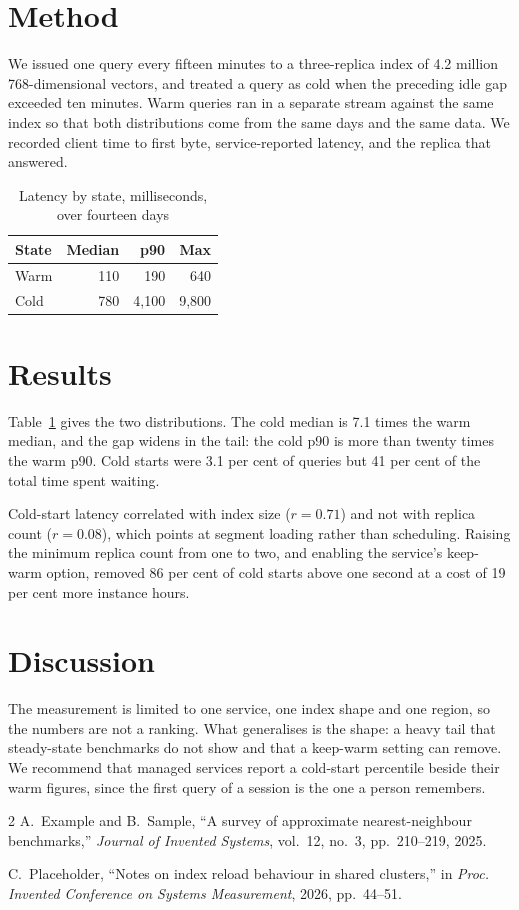 \documentclass[conference]{IEEEtran}
\begin{document}
\section{Method}
We issued one query every fifteen minutes to a three-replica index of 4.2 million
768-dimensional vectors, and treated a query as cold when the preceding idle gap exceeded
ten minutes. Warm queries ran in a separate stream against the same index so that both
distributions come from the same days and the same data. We recorded client time to first
byte, service-reported latency, and the replica that answered.

\begin{table}[b]
\caption{Latency by state, milliseconds, over fourteen days}
\label{tab:latency}
\centering
\begin{tabular}{lrrr}
\toprule
State & Median & p90 & Max \\
\midrule
Warm        & 110 & 190  & 640 \\
Cold        & 780 & 4{,}100 & 9{,}800 \\
\bottomrule
\end{tabular}
\end{table}

\section{Results}
Table~\ref{tab:latency} gives the two distributions. The cold median is 7.1 times the warm
median, and the gap widens in the tail: the cold p90 is more than twenty times the warm
p90. Cold starts were 3.1 per cent of queries but 41 per cent of the total time spent
waiting.

Cold-start latency correlated with index size ($r = 0.71$) and not with replica count
($r = 0.08$), which points at segment loading rather than scheduling. Raising the minimum
replica count from one to two, and enabling the service's keep-warm option, removed 86 per
cent of cold starts above one second at a cost of 19 per cent more instance hours.

\section{Discussion}
The measurement is limited to one service, one index shape and one region, so the numbers
are not a ranking. What generalises is the shape: a heavy tail that steady-state
benchmarks do not show and that a keep-warm setting can remove. We recommend that managed
services report a cold-start percentile beside their warm figures, since the first query
of a session is the one a person remembers.

\begin{thebibliography}{2}
A.~Example and B.~Sample, ``A survey of approximate nearest-neighbour benchmarks,''
\emph{Journal of Invented Systems}, vol.~12, no.~3, pp.~210--219, 2025.

C.~Placeholder, ``Notes on index reload behaviour in shared clusters,'' in \emph{Proc.
Invented Conference on Systems Measurement}, 2026, pp.~44--51.
\end{thebibliography}
\end{document}

